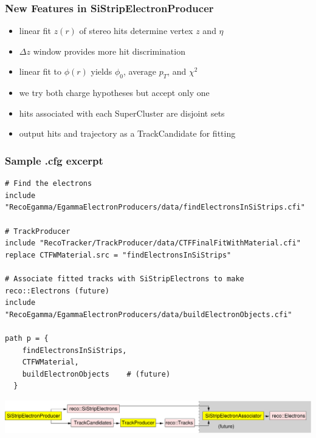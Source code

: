 \documentclass[12pt,compress]{beamer}
\begin{document}
\begin{frame}
\frametitle{New Features in SiStripElectronProducer}
\begin{itemize}\setlength{\itemsep}{0.5 cm}
\item linear fit $z(r)$ of stereo hits determine vertex $z$ and $\eta$
\item $\Delta z$ window provides more hit discrimination
\item linear fit to $\phi(r)$ yields $\phi_0$, average $p_T$, and $\chi^2$
\item we try both charge hypotheses but accept only one
\item hits associated with each SuperCluster are disjoint sets
\item output hits and trajectory as a TrackCandidate for fitting
\end{itemize}
\end{frame}

\begin{frame}[fragile]
\frametitle{Sample .cfg excerpt}

\hspace{-0.4 cm}\begin{minipage}{\linewidth}
\scriptsize
\begin{verbatim}
# Find the electrons
include "RecoEgamma/EgammaElectronProducers/data/findElectronsInSiStrips.cfi"

# TrackProducer
include "RecoTracker/TrackProducer/data/CTFFinalFitWithMaterial.cfi"
replace CTFWMaterial.src = "findElectronsInSiStrips"

# Associate fitted tracks with SiStripElectrons to make reco::Electrons (future)
include "RecoEgamma/EgammaElectronProducers/data/buildElectronObjects.cfi"

path p = {
    findElectronsInSiStrips,
    CTFWMaterial,
    buildElectronObjects    # (future)
  }
\end{verbatim}
\end{minipage}
\begin{center}
\includegraphics[width=\linewidth]{objects}
\end{center}
\end{frame}
\end{document}
